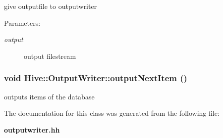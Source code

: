 give outputfile to outputwriter \begin{Desc}
\item[Parameters:]
\begin{description}
\item[{\em output}]output filestream \end{description}
\end{Desc}
\subsubsection[outputNextItem]{\setlength{\rightskip}{0pt plus 5cm}void Hive::OutputWriter::outputNextItem ()\hspace{0.3cm}{\tt  [protected]}}\label{classHive_1_1OutputWriter_ba89dae1ca1d31bf91d21731580fe03a}


outputs items of the database 

The documentation for this class was generated from the following file:\begin{CompactItemize}
\item 
{\bf outputwriter.hh}\end{CompactItemize}
